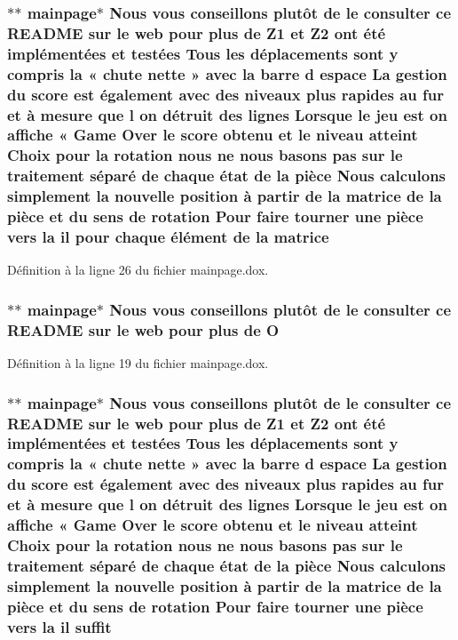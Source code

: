 \hypertarget{mainpage_8dox_af2e36bcdda8980a3e5c1f4013331ee45}{
\subsubsection[{matrice}]{\setlength{\rightskip}{0pt plus 5cm}$\ast$$\ast$ mainpage$\ast$ Nous vous conseillons plutô{\bf t} {\bf de} le consulter ce R\-E\-A\-D\-M\-E sur le web pour plus {\bf de} {\bf Z1} et Z2 ont é{\bf t}é implémentées et testées Tous les déplacements sont {\bf y} compris la « chute nette » avec la barre d espace La gestion du score est également avec des niveaux plus rapides au fur et à mesure que l on détruit des lignes Lorsque le jeu est on affiche « Game Over le score obtenu et le niveau atteint Choix pour la rotation nous ne nous basons pas sur le traitement {\bf s}éparé {\bf de} chaque état {\bf de} la pièce Nous calculons simplement la nouvelle position à partir {\bf de} la matrice {\bf de} la pièce et du {\bf sens} {\bf de} rotation Pour faire tourner une pièce vers la il pour chaque élément {\bf de} la matrice}}\label{mainpage_8dox_af2e36bcdda8980a3e5c1f4013331ee45}


Définition à la ligne 26 du fichier mainpage.\-dox.

\hypertarget{mainpage_8dox_abdf7c4e28de4c462789e8ddbcdd8d9a9}{
\subsubsection[{O}]{\setlength{\rightskip}{0pt plus 5cm}$\ast$$\ast$ mainpage$\ast$ Nous vous conseillons plutô{\bf t} {\bf de} le consulter ce R\-E\-A\-D\-M\-E sur le web pour plus {\bf de} O}}\label{mainpage_8dox_abdf7c4e28de4c462789e8ddbcdd8d9a9}


Définition à la ligne 19 du fichier mainpage.\-dox.

\hypertarget{mainpage_8dox_a3cef46abe2a50831a9672fa7c65a1bcb}{
\subsubsection[{suffit}]{\setlength{\rightskip}{0pt plus 5cm}$\ast$$\ast$ mainpage$\ast$ Nous vous conseillons plutô{\bf t} {\bf de} le consulter ce R\-E\-A\-D\-M\-E sur le web pour plus {\bf de} {\bf Z1} et Z2 ont é{\bf t}é implémentées et testées Tous les déplacements sont {\bf y} compris la « chute nette » avec la barre d espace La gestion du score est également avec des niveaux plus rapides au fur et à mesure que l on détruit des lignes Lorsque le jeu est on affiche « Game Over le score obtenu et le niveau atteint Choix pour la rotation nous ne nous basons pas sur le traitement {\bf s}éparé {\bf de} chaque état {\bf de} la pièce Nous calculons simplement la nouvelle position à partir {\bf de} la {\bf matrice} {\bf de} la pièce et du {\bf sens} {\bf de} rotation Pour faire tourner une pièce vers la il suffit}}\label{mainpage_8dox_a3cef46abe2a50831a9672fa7c65a1bcb}


